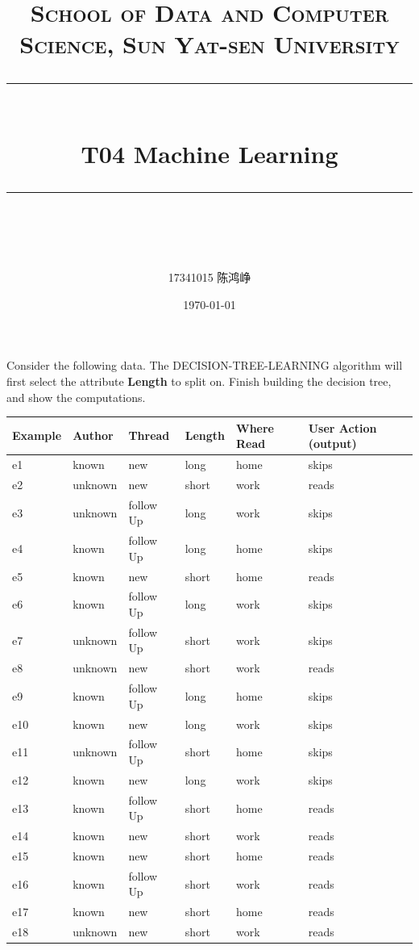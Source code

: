 \documentclass[a4paper, 11pt]{article}
\title{
\normalfont \normalsize
\textsc{School of Data and Computer Science, Sun Yat-sen University} \\ [25pt] %
\rule{\textwidth}{0.5pt} \\[0.4cm] %
\huge  T04 Machine Learning\\ %
\rule{\textwidth}{2pt} \\[0.5cm] %
\author{17341015 陈鸿峥}
\date{\normalsize\today}
}
\begin{document}
\maketitle

\newpage
\begin{question}\normalfont
Consider the following data. The DECISION-TREE-LEARNING algorithm will first select the attribute \textbf{Length} to split on. Finish building the decision tree, and show the computations.
\begin{center}
\begin{tabular}{|l|l|l|l|l|l|}\hline
    \textbf{Example} & \textbf{Author} & \textbf{Thread} & \textbf{Length} & \textbf{Where Read} & \textbf{User Action (output)}\\\hline
    e1 & known & new & long & home & skips\\\hline
    e2 & unknown & new & short & work & reads\\\hline
    e3 & unknown & follow Up & long & work & skips\\\hline
    e4 & known & follow Up & long & home & skips\\\hline
    e5 & known & new & short & home & reads\\\hline
    e6 & known & follow Up & long & work & skips\\\hline
    e7 & unknown & follow Up & short & work & skips\\\hline
    e8 & unknown & new & short & work & reads\\\hline
    e9 & known & follow Up & long & home & skips\\\hline
    e10 & known & new & long & work & skips\\\hline
    e11 & unknown & follow Up & short & home & skips\\\hline
    e12 & known & new & long & work & skips\\\hline
    e13 & known & follow Up & short & home & reads\\\hline
    e14 & known & new & short & work & reads\\\hline
    e15 & known & new & short & home & reads\\\hline
    e16 & known & follow Up & short & work & reads\\\hline
    e17 & known & new & short & home & reads\\\hline
    e18 & unknown & new & short & work & reads\\\hline
\end{tabular}
\end{center}
\end{question}
\end{document}
